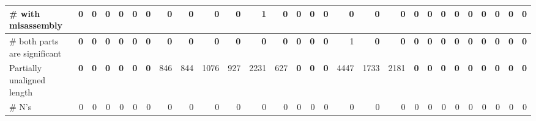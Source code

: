 \documentclass[12pt,a4paper]{article}
\begin{document}
\begin{table}[ht]
\begin{center}
\begin{tabular}{|l*{27}{|r}|}
\hspace{5mm}\# with misassembly & {\bf 0} & {\bf 0} & {\bf 0} & {\bf 0} & {\bf 0} & {\bf 0} & {\bf 0} & {\bf 0} & {\bf 0} & {\bf 0} & 1 & {\bf 0} & {\bf 0} & {\bf 0} & {\bf 0} & {\bf 0} & {\bf 0} & {\bf 0} & {\bf 0} & {\bf 0} & {\bf 0} & {\bf 0} & {\bf 0} & {\bf 0} & {\bf 0} & {\bf 0} & {\bf 0} \\ \hline
\hspace{5mm}\# both parts are significant & {\bf 0} & {\bf 0} & {\bf 0} & {\bf 0} & {\bf 0} & {\bf 0} & {\bf 0} & {\bf 0} & {\bf 0} & {\bf 0} & {\bf 0} & {\bf 0} & {\bf 0} & {\bf 0} & {\bf 0} & 1 & {\bf 0} & {\bf 0} & {\bf 0} & {\bf 0} & {\bf 0} & {\bf 0} & {\bf 0} & {\bf 0} & {\bf 0} & {\bf 0} & {\bf 0} \\ \hline
Partially unaligned length & {\bf 0} & {\bf 0} & {\bf 0} & {\bf 0} & {\bf 0} & {\bf 0} & 846 & 844 & 1076 & 927 & 2231 & 627 & {\bf 0} & {\bf 0} & {\bf 0} & 4447 & 1733 & 2181 & {\bf 0} & {\bf 0} & {\bf 0} & {\bf 0} & {\bf 0} & {\bf 0} & {\bf 0} & {\bf 0} & {\bf 0} \\ \hline
\# N's & 0 & 0 & 0 & 0 & 0 & 0 & 0 & 0 & 0 & 0 & 0 & 0 & 0 & 0 & 0 & 0 & 0 & 0 & 0 & 0 & 0 & 0 & 0 & 0 & 0 & 0 & 0 \\ \hline
\end{tabular}
\end{center}
\end{table}
\end{document}
